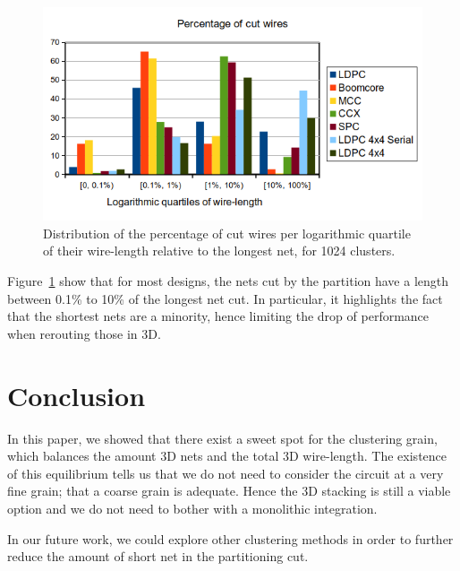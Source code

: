 \documentclass[conference]{IEEEtran}
\begin{document}
\begin{figure}[!t]
\centering
\includegraphics[width=\linewidth]{netCutWL_maxcut_all_log-quartv3.png}
\caption{Distribution of the percentage of cut wires per logarithmic quartile of their wire-length relative to the longest net, for 1024 clusters.}
\label{fig:dits-wl-quart}
\end{figure}

Figure~\ref{fig:dits-wl-quart} show that for most designs, the nets cut by the partition have a length between 0.1\% to 10\% of the longest net cut.
In particular, it highlights the fact that the shortest nets are a minority, hence limiting the drop of performance when rerouting those in 3D.



\section{Conclusion}
In this paper, we showed that there exist a sweet spot for the clustering grain, which balances the amount 3D nets and the total 3D wire-length.
The existence of this equilibrium tells us that we do not need to consider the circuit at a very fine grain; that a coarse grain is adequate.
Hence the 3D stacking is still a viable option and we do not need to bother with a monolithic integration.

In our future work, we could explore other clustering methods in order to further reduce the amount of short net in the partitioning cut.





\end{document}
